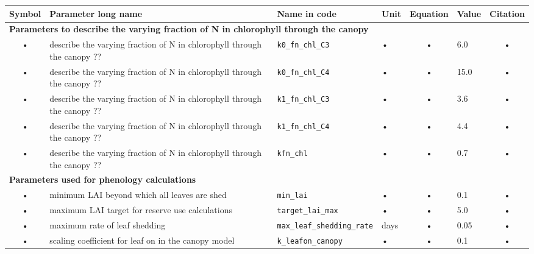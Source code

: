 \begin{table}
\begin{tabularx}{\linewidth}{|c|X|l|l|c|l|c|} %
\hline 
Symbol & Parameter long name & Name in code & Unit & Equation & Value & Citation \\ 
\hline 

\multicolumn{6}{l}{\bf Parameters to describe the varying fraction of N in chlorophyll through the canopy}\\
\hline
• & describe the varying fraction of N in chlorophyll through the canopy ?? & \texttt{k0\_fn\_chl\_C3} & • & • & 6.0 & • \\  
• & describe the varying fraction of N in chlorophyll through the canopy ?? & \texttt{k0\_fn\_chl\_C4} & • & • & 15.0 & • \\    
• & describe the varying fraction of N in chlorophyll through the canopy ?? & \texttt{k1\_fn\_chl\_C3} & • & • & 3.6 & • \\  
• & describe the varying fraction of N in chlorophyll through the canopy ?? & \texttt{k1\_fn\_chl\_C4} & • & • & 4.4 & • \\    
• & describe the varying fraction of N in chlorophyll through the canopy ?? & \texttt{kfn\_chl} & • & • & 0.7 & • \\  
\hline 

\multicolumn{6}{l}{\bf Parameters used for phenology calculations}\\
\hline
• & minimum LAI beyond which all leaves are shed & \texttt{min\_lai} & • & • & 0.1 & • \\    
• & maximum LAI target for reserve use calculations & \texttt{target\_lai\_max} & • & • & 5.0 & • \\  
• & maximum rate of leaf shedding & \texttt{max\_leaf\_shedding\_rate} & days & • & 0.05 & • \\  
• & scaling coefficient for leaf on in the canopy model & \texttt{k\_leafon\_canopy} & • & • & 0.1 & • \\
\hline 
\end{tabularx}
\end{table}


